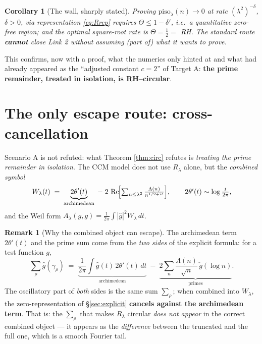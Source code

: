 \documentclass[11pt]{article}
\theoremstyle{plain}
\newtheorem{corollary}{Corollary}
\theoremstyle{definition}
\newtheorem{remark}{Remark}
\newcommand{\Lam}{\Lambda}
\DeclareMathOperator{\Real}{Re}
\newcommand{\half}{\tfrac12}
\begin{document}
\begin{corollary}[The wall, sharply stated]
Proving $\mathrm{piso}_\lambda(n)\to0$ at rate $(\lambda^2)^{-\delta}$, $\delta>0$,
via representation \eqref{eq:Rrep} \emph{requires} $\Theta\le1-\delta'$, i.e.\
a quantitative zero-free region; and the optimal square-root rate is
$\Theta=\half=$ RH. The standard route \textbf{cannot} close Link 2 without
assuming (part of) what it wants to prove.
\end{corollary}

\noindent This confirms, now with a proof, what the numerics only
hinted at and what had already appeared as the ``adjusted constant $c=2$'' of
Target A: \textbf{the prime remainder, treated in isolation, is RH--circular}.

\section{The only escape route: cross-cancellation}\label{sec:escape}

Scenario A is not refuted: what Theorem \ref{thm:circ} refutes is
\emph{treating the prime remainder in isolation}. The CCM model does not use $R_\lambda$
alone, but the \emph{combined symbol}
\begin{equation}\label{eq:Wlam}
  W_\lambda(t)\;=\;\underbrace{2\theta'(t)}_{\text{archimedean}}
  \;-\;2\,\Real\!\Bigl[\textstyle\sum_{n\le\lambda^2}\frac{\Lam(n)}{n^{1/2+it}}\Bigr],
  \qquad
  2\theta'(t)\sim\log\frac{t}{2\pi},
\end{equation}
and the Weil form $A_\lambda(g,g)=\frac1{2\pi}\int|\widehat g|^2 W_\lambda\,dt$.

\begin{remark}[Why the combined object can escape]\label{rem:escape}
The archimedean term $2\theta'(t)$ and the prime sum come from the
\emph{two sides} of the explicit formula: for a test function $g$,
\[
  \sum_\rho \widehat g(\gamma_\rho)
  \;=\;\underbrace{\frac1{2\pi}\!\int \widehat g(t)\,2\theta'(t)\,dt}_{\text{archimedean}}
  \;-\;\underbrace{2\sum_n\frac{\Lam(n)}{\sqrt n}\,\check g(\log n)}_{\text{primes}} .
\]
The oscillatory part of \emph{both} sides is the same sum $\sum_\rho$; when
combined into $W_\lambda$, the zero-representation of
\S\ref{sec:explicit} \textbf{cancels against the archimedean term}. That is: the
$\sum_\rho$ that makes $R_\lambda$ circular \emph{does not appear} in the correct
combined object --- it appears as the \emph{difference} between the truncated and the
full one, which is a smooth Fourier tail.
\end{remark}
\end{document}
